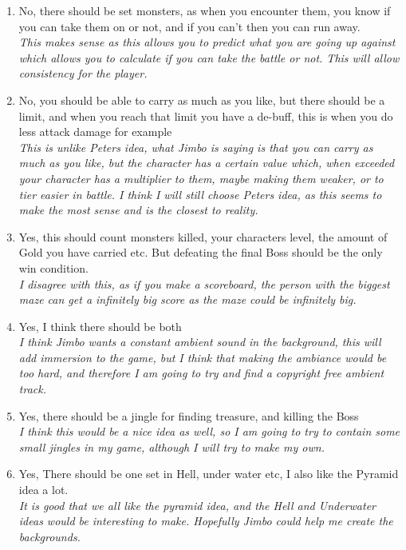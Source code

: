 \documentclass[12pt]{article}
\begin{document}
\begin{enumerate}
	\item{No, there should be set monsters, as when you encounter them, you know if you can take them on or not, and if you can't then you can run away. \\}
	\em{This makes sense as this allows you to predict what you are going up against which allows you to calculate if you can take the battle or not. This will allow consistency for the player.}
	
	\item{No, you should be able to carry as much as you like, but there should be a limit, and when you reach that limit you have a de-buff, this is when you do less attack damage for example \\}
	\em{This is unlike Peters idea, what Jimbo is saying is that you can carry as much as you like, but the character has a certain value which, when exceeded your character has a multiplier to them, maybe making them weaker, or to tier easier in battle. I think I will still choose Peters idea, as this seems to make the most sense and is the closest to reality.}
	
	\item{Yes, this should count monsters killed, your characters level, the amount of Gold you have carried etc. But defeating the final Boss should be the only win condition. \\}
	\em{I disagree with this, as if you make a scoreboard, the person with the biggest maze can get a infinitely big score as the maze could be infinitely big.}
	
	\item{Yes, I think there should be both \\}
	\em{I think Jimbo wants a constant ambient sound in the background, this will add immersion to the game, but I think that making the ambiance would be too hard, and therefore I am going to try and find a copyright free ambient track.}
	
	\item{Yes, there should be a jingle for finding treasure, and killing the Boss \\}
	\em{I think this would be a nice idea as well, so I am going to try to contain some small jingles in my game, although I will try to make my own.}
	
	\item{Yes, There should be one set in Hell, under water etc, I also like the Pyramid idea a lot. \\}
	\em{It is good that we all like the pyramid idea, and the Hell and Underwater ideas would be interesting to make. Hopefully Jimbo could help me create the backgrounds.}
	

\end{enumerate}
\end{document}
